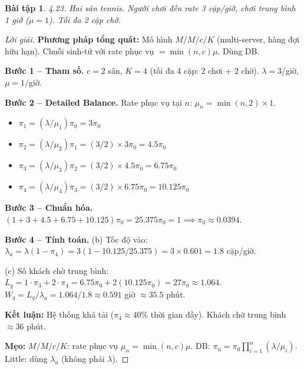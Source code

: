 \documentclass[8pt,a4paper]{article}
\newtheorem{exercise}{Bài tập}
\newenvironment{solution}{\begin{proof}[Lời giải]}{\end{proof}}
\begin{document}
\begin{exercise}
4.23. Hai sân tennis. Người chơi đến rate 3 cặp/giờ, chơi trung bình 1 giờ ($\mu = 1$). Tối đa 2 cặp chờ. 
\end{exercise}
\begin{solution}
\textbf{Phương pháp tổng quát:} Mô hình $M/M/c/K$ (multi-server, hàng đợi hữu hạn). Chuỗi sinh-tử với rate phục vụ $= \min(n, c)\mu$. Dùng DB.

\textbf{Bước 1 -- Tham số.} $c = 2$ sân, $K = 4$ (tối đa 4 cặp: 2 chơi + 2 chờ). $\lambda = 3$/giờ, $\mu = 1$/giờ.

\textbf{Bước 2 -- Detailed Balance.} Rate phục vụ tại $n$: $\mu_n = \min(n,2) \times 1$.
\begin{itemize}[nosep]
\item $\pi_1 = (\lambda/\mu_1)\pi_0 = 3\pi_0$
\item $\pi_2 = (\lambda/\mu_2)\pi_1 = (3/2) \times 3\pi_0 = 4.5\pi_0$
\item $\pi_3 = (\lambda/\mu_3)\pi_2 = (3/2) \times 4.5\pi_0 = 6.75\pi_0$
\item $\pi_4 = (\lambda/\mu_4)\pi_3 = (3/2) \times 6.75\pi_0 = 10.125\pi_0$
\end{itemize}

\textbf{Bước 3 -- Chuẩn hóa.} $(1+3+4.5+6.75+10.125)\pi_0 = 25.375\pi_0 = 1 \implies \pi_0 \approx 0.0394$.

\textbf{Bước 4 -- Tính toán.}
(b) Tốc độ vào: $\lambda_a = \lambda(1-\pi_4) = 3(1 - 10.125/25.375) = 3 \times 0.601 = \boxed{1.8}$ cặp/giờ.

(c) Số khách chờ trung bình: $L_q = 1 \cdot \pi_3 + 2 \cdot \pi_4 = 6.75\pi_0 + 2(10.125\pi_0) = 27\pi_0 \approx 1.064$.
$W_q = L_q / \lambda_a = 1.064/1.8 \approx \boxed{0.591}$ giờ $\approx 35.5$ phút.

\textbf{Kết luận:} Hệ thống khá tải ($\pi_4 \approx 40\%$ thời gian đầy). Khách chờ trung bình $\approx 36$ phút.

\textbf{Mẹo:} $M/M/c/K$: rate phục vụ $\mu_n = \min(n,c)\mu$. DB: $\pi_n = \pi_0 \prod_{i=1}^n (\lambda/\mu_i)$. Little: dùng $\lambda_a$ (không phải $\lambda$).
\end{solution}
\end{document}
